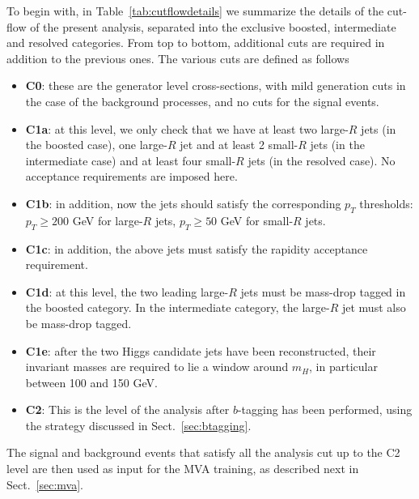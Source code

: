 To begin with,
in Table~\ref{tab:cutflowdetails}
we summarize the details of the cut-flow of the present analysis,
separated into the exclusive boosted, intermediate
    and resolved categories.
    From top to bottom, additional cuts are required in addition
    to the previous ones.
    The various cuts
    are defined as follows
    \begin{itemize}
    \item {\bf C0}: these are the generator level cross-sections, with
      mild generation cuts in the case of the background processes, and no cuts
      for the signal events.
    \item {\bf C1a}: at this level, we only check that we have at least
      two large-$R$ jets (in the boosted case),
      one large-$R$ jet and at least 2 small-$R$ jets (in the intermediate
      case) and at least four small-$R$ jets (in the resolved case).
      No acceptance requirements are imposed here.
    \item {\bf C1b}: in addition, now the jets should
      satisfy the corresponding $p_T$ thresholds:
      $p_T \ge 200$ GeV for large-$R$ jets,
      $p_T \ge 50$ GeV for small-$R$ jets.
    \item {\bf C1c}: in addition, the above jets must satisfy the
      rapidity acceptance requirement.
    \item {\bf C1d}: at this level, the two leading large-$R$ jets must
      be mass-drop tagged in the boosted category.
      In the intermediate category, the large-$R$ jet must also be mass-drop tagged.
    \item {\bf C1e}: after the two Higgs candidate jets have been reconstructed,
      their invariant masses are required to lie a window around $m_H$,
      in particular between 100 and 150 GeV.
          \item {\bf C2}: This is the level of the analysis
            after $b$-tagging has been performed, using the strategy discussed
            in Sect.~\ref{sec:btagging}.
      \end{itemize}
    The signal and background events that satisfy all the analysis cut up to the
    C2 level
    are then used as input for the MVA training, as described next
    in Sect.~\ref{sec:mva}.

